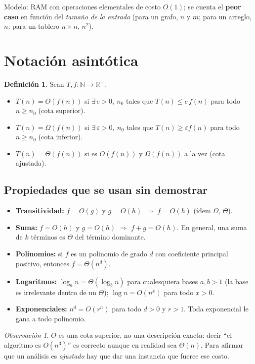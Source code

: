 \documentclass[11pt,a4paper]{article}
\theoremstyle{plain}
\theoremstyle{definition}
\newtheorem{definicion}[teorema]{Definición}
\theoremstyle{remark}
\newtheorem*{observacion}{Observación}
\begin{document}
Modelo: RAM con operaciones elementales de costo $O(1)$; se cuenta el
\textbf{peor caso} en función del \emph{tamaño de la entrada} (para un grafo,
$n$ y $m$; para un arreglo, $n$; para un tablero $n\times n$, $n^2$).

\section{Notación asintótica}

\begin{definicion}
Sean $T,f:\mathbb{N}\to\mathbb{R}^{+}$.
\begin{itemize}
\item $T(n)=O(f(n))$ si $\exists\,c>0,\ n_0$ tales que $T(n)\le c\,f(n)$ para todo
$n\ge n_0$ \quad(cota superior).
\item $T(n)=\Omega(f(n))$ si $\exists\,\varepsilon>0,\ n_0$ tales que
$T(n)\ge \varepsilon f(n)$ para todo $n\ge n_0$ \quad(cota inferior).
\item $T(n)=\Theta(f(n))$ si es $O(f(n))$ y $\Omega(f(n))$ a la vez \quad(cota ajustada).
\end{itemize}
\end{definicion}

\subsection{Propiedades que se usan sin demostrar}

\begin{itemize}
\item \textbf{Transitividad:} $f=O(g)$ y $g=O(h)$ $\Rightarrow$ $f=O(h)$ (ídem
$\Omega$, $\Theta$).
\item \textbf{Suma:} $f=O(h)$ y $g=O(h)$ $\Rightarrow$ $f+g=O(h)$. En general, una
suma de $k$ términos es $\Theta$ del término dominante.
\item \textbf{Polinomios:} si $f$ es un polinomio de grado $d$ con coeficiente
principal positivo, entonces $f=\Theta(n^d)$.
\item \textbf{Logaritmos:} $\log_a n=\Theta(\log_b n)$ para cualesquiera bases
$a,b>1$ (la base es irrelevante dentro de un $\Theta$); $\log n = O(n^x)$ para todo
$x>0$.
\item \textbf{Exponenciales:} $n^d = O(r^n)$ para todo $d>0$ y $r>1$. Toda exponencial
le gana a todo polinomio.
\end{itemize}

\begin{observacion}
$O$ es una cota superior, no una descripción exacta: decir ``el algoritmo es
$O(n^3)$'' es correcto aunque en realidad sea $\Theta(n)$. Para afirmar que un
análisis es \emph{ajustado} hay que dar una instancia que fuerce ese costo.
\end{observacion}
\end{document}
